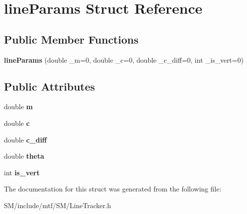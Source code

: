 \hypertarget{structlineParams}{\section{line\-Params Struct Reference}
\label{structlineParams}
}
\subsection*{Public Member Functions}
\begin{DoxyCompactItemize}
\item 
\hypertarget{structlineParams_a5cbc853c68f95de3bd016353ca6bd365}{{\bfseries line\-Params} (double \-\_\-m=0, double \-\_\-c=0, double \-\_\-c\-\_\-diff=0, int \-\_\-is\-\_\-vert=0)}\label{structlineParams_a5cbc853c68f95de3bd016353ca6bd365}

\end{DoxyCompactItemize}
\subsection*{Public Attributes}
\begin{DoxyCompactItemize}
\item 
\hypertarget{structlineParams_a541b41582e5991e6552d7853d1a74ecc}{double {\bfseries m}}\label{structlineParams_a541b41582e5991e6552d7853d1a74ecc}

\item 
\hypertarget{structlineParams_a2be3229c4d185aa3b80e584b2ba60f60}{double {\bfseries c}}\label{structlineParams_a2be3229c4d185aa3b80e584b2ba60f60}

\item 
\hypertarget{structlineParams_ac8d0b472526dc0b2aa4b034bc5b82d4c}{double {\bfseries c\-\_\-diff}}\label{structlineParams_ac8d0b472526dc0b2aa4b034bc5b82d4c}

\item 
\hypertarget{structlineParams_acd28af26555ef16a475901e0f27781b7}{double {\bfseries theta}}\label{structlineParams_acd28af26555ef16a475901e0f27781b7}

\item 
\hypertarget{structlineParams_ad7e133352b0c755644c359a03eb3a441}{int {\bfseries is\-\_\-vert}}\label{structlineParams_ad7e133352b0c755644c359a03eb3a441}

\end{DoxyCompactItemize}


The documentation for this struct was generated from the following file\-:\begin{DoxyCompactItemize}
\item 
S\-M/include/mtf/\-S\-M/Line\-Tracker.\-h\end{DoxyCompactItemize}
